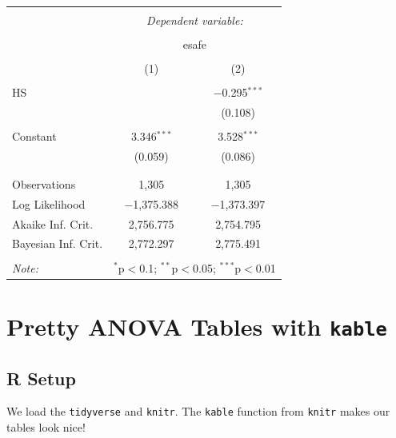 \documentclass[
  letterpaper,
  DIV=11,
  numbers=noendperiod]{scrreprt}
\begin{document}
\begin{table}[!htbp] \centering 
  \caption{} 
  \label{} 
\begin{tabular}{@{\extracolsep{5pt}}lcc} 
\\[-1.8ex]\hline 
\hline \\[-1.8ex] 
 & \multicolumn{2}{c}{\textit{Dependent variable:}} \\ 
\cline{2-3} 
\\[-1.8ex] & \multicolumn{2}{c}{esafe} \\ 
\\[-1.8ex] & (1) & (2)\\ 
\hline \\[-1.8ex] 
 HS &  & $-$0.295$^{***}$ \\ 
  &  & (0.108) \\ 
  & & \\ 
 Constant & 3.346$^{***}$ & 3.528$^{***}$ \\ 
  & (0.059) & (0.086) \\ 
  & & \\ 
\hline \\[-1.8ex] 
Observations & 1,305 & 1,305 \\ 
Log Likelihood & $-$1,375.388 & $-$1,373.397 \\ 
Akaike Inf. Crit. & 2,756.775 & 2,754.795 \\ 
Bayesian Inf. Crit. & 2,772.297 & 2,775.491 \\ 
\hline 
\hline \\[-1.8ex] 
\textit{Note:}  & \multicolumn{2}{r}{$^{*}$p$<$0.1; $^{**}$p$<$0.05; $^{***}$p$<$0.01} \\ 
\end{tabular} 
\end{table}

\hypertarget{pretty-anova-tables-with-kable}{%
\chapter{\texorpdfstring{Pretty ANOVA Tables with
\texttt{kable}}{Pretty ANOVA Tables with kable}}\label{pretty-anova-tables-with-kable}}

\hypertarget{r-setup}{%
\section{R Setup}\label{r-setup}}

We load the \texttt{tidyverse} and \texttt{knitr}. The \texttt{kable}
function from \texttt{knitr} makes our tables look nice!
\end{document}
